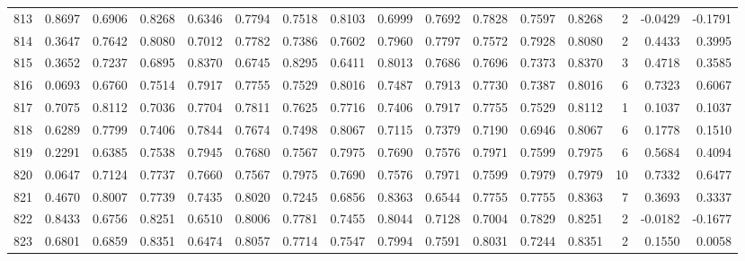 \begin{tabular}{lrrrrrrrrrrrrrrr}
813 &      0.8697 &  0.6906 &  0.8268 &  0.6346 &  0.7794 &  0.7518 &  0.8103 &  0.6999 &  0.7692 &  0.7828 &   0.7597 &     0.8268 &      2 &                   -0.0429 &                    -0.1791 \\
814 &      0.3647 &  0.7642 &  0.8080 &  0.7012 &  0.7782 &  0.7386 &  0.7602 &  0.7960 &  0.7797 &  0.7572 &   0.7928 &     0.8080 &      2 &                    0.4433 &                     0.3995 \\
815 &      0.3652 &  0.7237 &  0.6895 &  0.8370 &  0.6745 &  0.8295 &  0.6411 &  0.8013 &  0.7686 &  0.7696 &   0.7373 &     0.8370 &      3 &                    0.4718 &                     0.3585 \\
816 &      0.0693 &  0.6760 &  0.7514 &  0.7917 &  0.7755 &  0.7529 &  0.8016 &  0.7487 &  0.7913 &  0.7730 &   0.7387 &     0.8016 &      6 &                    0.7323 &                     0.6067 \\
817 &      0.7075 &  0.8112 &  0.7036 &  0.7704 &  0.7811 &  0.7625 &  0.7716 &  0.7406 &  0.7917 &  0.7755 &   0.7529 &     0.8112 &      1 &                    0.1037 &                     0.1037 \\
818 &      0.6289 &  0.7799 &  0.7406 &  0.7844 &  0.7674 &  0.7498 &  0.8067 &  0.7115 &  0.7379 &  0.7190 &   0.6946 &     0.8067 &      6 &                    0.1778 &                     0.1510 \\
819 &      0.2291 &  0.6385 &  0.7538 &  0.7945 &  0.7680 &  0.7567 &  0.7975 &  0.7690 &  0.7576 &  0.7971 &   0.7599 &     0.7975 &      6 &                    0.5684 &                     0.4094 \\
820 &      0.0647 &  0.7124 &  0.7737 &  0.7660 &  0.7567 &  0.7975 &  0.7690 &  0.7576 &  0.7971 &  0.7599 &   0.7979 &     0.7979 &     10 &                    0.7332 &                     0.6477 \\
821 &      0.4670 &  0.8007 &  0.7739 &  0.7435 &  0.8020 &  0.7245 &  0.6856 &  0.8363 &  0.6544 &  0.7755 &   0.7755 &     0.8363 &      7 &                    0.3693 &                     0.3337 \\
822 &      0.8433 &  0.6756 &  0.8251 &  0.6510 &  0.8006 &  0.7781 &  0.7455 &  0.8044 &  0.7128 &  0.7004 &   0.7829 &     0.8251 &      2 &                   -0.0182 &                    -0.1677 \\
823 &      0.6801 &  0.6859 &  0.8351 &  0.6474 &  0.8057 &  0.7714 &  0.7547 &  0.7994 &  0.7591 &  0.8031 &   0.7244 &     0.8351 &      2 &                    0.1550 &                     0.0058 \\

\end{tabular}
